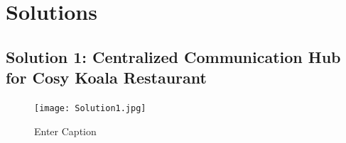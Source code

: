 \documentclass{article}
\begin{document}



\clearpage
\section{Solutions}
\subsection{Solution 1: Centralized Communication Hub for Cosy Koala Restaurant}

\begin{figure}
    \centering
    \texttt{[image: Solution1.jpg]}
    \caption{Enter Caption}
    \label{fig:enter-label}
\end{figure}
\end{document}

